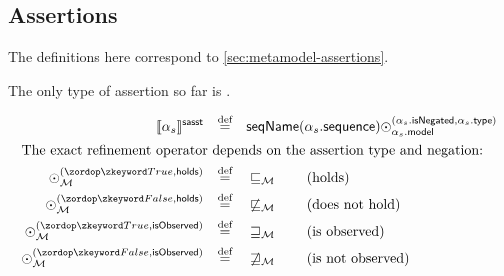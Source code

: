 \begin{defn}
\end{defn}

\begin{defn}
\end{defn}
\begin{defn}
\end{defn}

\begin{defn}
\end{defn}

\subsection{Assertions}

The definitions here correspond to \cref{sec:metamodel-assertions}.

\begin{defn}[\massertion]

The only type of assertion so far is \msequenceassertion.

\newcommand{\refop}[3]{\mathbin{\odot_{#1}^{(#2, #3)}}}

\begin{align*}
	\asstsema{\asasst}
\quad\defeq\quad&
	\seqnameOf{\field{\asasst}{sequence}}
	\refop{\field{\asasst}{model}}{\field{\asasst}{isNegated}}{\field{\asasst}{type}}
\\
\intertext{The exact refinement operator depends on the assertion type and
negation:}
	\refop{\amodel}{\true}{\mathsf{holds}}
\quad\defeq\quad&
	\sqsubseteq_\amodel
\tag{holds}
\\
	\refop{\amodel}{\false}{\mathsf{holds}}
\quad\defeq\quad&
	\not\sqsubseteq_\amodel
\tag{does not hold}
\\
	\refop{\amodel}{\true}{\mathsf{isObserved}}
\quad\defeq\quad&
	\sqsupseteq_\amodel
\tag{is observed}
\\
	\refop{\amodel}{\false}{\mathsf{isObserved}}
\quad\defeq\quad&
	\not\sqsupseteq_\amodel
\tag{is not observed}
\\
\end{align*}
\end{defn}